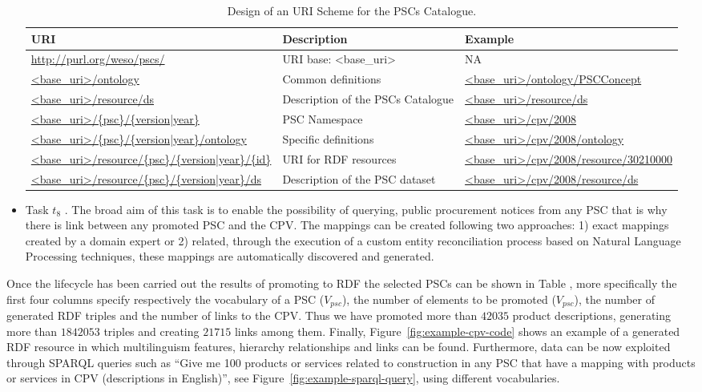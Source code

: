 \begin{itemize}
 
 \begin{table}[!ht]
\renewcommand{\arraystretch}{1.3}
\begin{center}
\begin{tabular}[c]{|p{5cm}|p{4.5cm}|p{5cm}|} 
\hline
  \textbf{URI} &  \textbf{Description} & \textbf{Example} \\\hline
  \url{http://purl.org/weso/pscs/} & URI base: <base\_uri> & NA \\ \hline
  \url{<base_uri>/ontology} & Common definitions & \url{<base_uri>/ontology/PSCConcept} \\ \hline
  \url{<base_uri>/resource/ds} & Description of the PSCs Catalogue & \url{<base_uri>/resource/ds} \\ \hline
  \url{<base_uri>/{psc}/{version|year}} & PSC Namespace & \url{<base_uri>/cpv/2008} \\ \hline
  \url{<base_uri>/{psc}/{version|year}/ontology} & Specific definitions & \url{<base_uri>/cpv/2008/ontology} \\ \hline
  \url{<base_uri>/resource/{psc}/{version|year}/{id}} & URI for RDF resources & \url{<base_uri>/cpv/2008/resource/30210000} \\ \hline
  \url{<base_uri>/resource/{psc}/{version|year}/ds} & Description of the PSC dataset  & \url{<base_uri>/cpv/2008/resource/ds} \\ \hline
\hline
\end{tabular}
\caption{Design of an URI Scheme for the PSCs Catalogue.}\label{table:pscs-uri}
  \end{center}
\end{table} 

\item Task $t_8$ . The broad aim of this task is to enable the possibility of querying, 
public procurement notices from any PSC that is why there is link between any promoted PSC and the CPV. 
The mappings can be created following two approaches: 1) exact mappings created by a domain expert or 2) related, 
through the execution of a custom entity reconciliation process based on Natural Language Processing techniques, 
these mappings are automatically discovered and generated.

\end{itemize}

Once the lifecycle has been carried out the results of promoting to RDF the selected PSCs can be shown in Table , 
more specifically the first four columns specify respectively the vocabulary of a PSC ($V_{psc}$), the number of elements 
to be promoted ($V_{psc}$), the number of generated RDF triples and the number of links to the CPV. 
Thus we have promoted more than $42035$ product descriptions, generating more than $1842053$ triples and creating $21715$ 
links among them. Finally, Figure~\ref{fig:example-cpv-code}  shows an example of a generated RDF resource in which multilinguism features, 
hierarchy relationships and links can be found. Furthermore, data can be now exploited through SPARQL queries 
such as ``Give me 100 products or services related to construction in any PSC that 
have a mapping with products or services in CPV (descriptions in English)'', see Figure~\ref{fig:example-sparql-query}, using different vocabularies.




